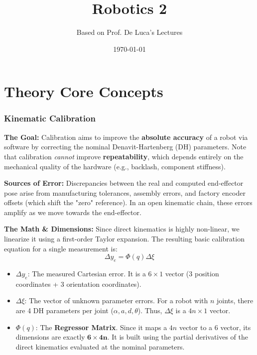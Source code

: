 \documentclass[11pt,a4paper]{article}
\title{\textbf{\Huge Robotics 2}}
\author{Based on Prof. De Luca's Lectures}
\date{\today}
\begin{document}
\maketitle
\tableofcontents
\newpage

\part*{Theory Core Concepts}

\section{Kinematic Calibration}
\textbf{The Goal:} Calibration aims to improve the \textbf{absolute accuracy} of a robot via software by correcting the nominal Denavit-Hartenberg (DH) parameters. Note that calibration \textit{cannot} improve \textbf{repeatability}, which depends entirely on the mechanical quality of the hardware (e.g., backlash, component stiffness).

\textbf{Sources of Error:} Discrepancies between the real and computed end-effector pose arise from manufacturing tolerances, assembly errors, and factory encoder offsets (which shift the "zero" reference). In an open kinematic chain, these errors amplify as we move towards the end-effector.

\textbf{The Math \& Dimensions:} Since direct kinematics is highly non-linear, we linearize it using a first-order Taylor expansion. The resulting basic calibration equation for a single measurement is:
\begin{equation}
    \Delta y_e = \Phi(q) \Delta \xi
\end{equation}
\begin{itemize}
    \item $\Delta y_e$: The measured Cartesian error. It is a $6 \times 1$ vector (3 position coordinates + 3 orientation coordinates).
    \item $\Delta \xi$: The vector of unknown parameter errors. For a robot with $n$ joints, there are 4 DH parameters per joint ($\alpha, a, d, \theta$). Thus, $\Delta \xi$ is a $4n \times 1$ vector.
    \item $\Phi(q)$: The \textbf{Regressor Matrix}. Since it maps a $4n$ vector to a $6$ vector, its dimensions are exactly $\mathbf{6 \times 4n}$. It is built using the partial derivatives of the direct kinematics evaluated at the nominal parameters.
\end{itemize}
\end{document}
